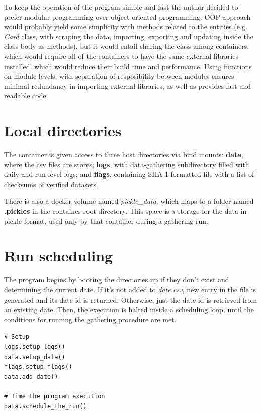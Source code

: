 To keep the operation of the program simple and fast the author decided to prefer modular programming over object-oriented programming. OOP approach would probably yield some simplicity with methods related to the entities (e.g. \textit{Card} class, with scraping the data, importing, exporting and updating inside the class body as methods), but it would entail sharing the class among containers, which would require all of the containers to have the same external libraries installed, which would reduce their build time and performance. Using functions on module-levels, with separation of resposibility between modules ensures minimal redundancy in importing external libraries, as well as provides fast and readable code.


\section{Local directories}
The container is given access to three host directories via bind mounts: \textbf{data}, where the csv files are stores; \textbf{logs}, with data-gathering subdirectory filled with daily and run-level logs; and \textbf{flags}, containing SHA-1 formatted file with a list of checksums of verified datasets. \par
There is also a docker volume named \textit{pickle\_data}, which maps to a folder named \textbf{.pickles} in the container root directory. This space is a storage for the data in pickle format, used only by that container during a gathering run.

\section{Run scheduling}
The program begins by booting the directories up if they don't exist and determining the current date. If it's not added to \textit{date.csv}, new entry in the file is generated and its date id is returned. Otherwise, just the date id is retrieved from an existing date. Then, the execution is halted inside a scheduling loop, until the conditions for running the gathering procedure are met. \par \noindent
\texttt{\# Setup \\ logs.setup\_logs() \\ data.setup\_data() \\ flags.setup\_flags() \\ data.add\_date() \\ \\ \# Time the program execution \\ data.schedule\_the\_run()}

